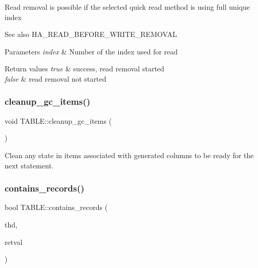 Read removal is possible if the selected quick read method is using full unique index

\begin{DoxySeeAlso}{See also}
H\+A\+\_\+\+R\+E\+A\+D\+\_\+\+B\+E\+F\+O\+R\+E\+\_\+\+W\+R\+I\+T\+E\+\_\+\+R\+E\+M\+O\+V\+AL
\end{DoxySeeAlso}

\begin{DoxyParams}{Parameters}
{\em index} & Number of the index used for read\\
\hline
\end{DoxyParams}

\begin{DoxyRetVals}{Return values}
{\em true} & success, read removal started \\
\hline
{\em false} & read removal not started \\
\hline
\end{DoxyRetVals}
\mbox{\label{structTABLE_a909ba0f0bb359144360ba9ef643cb3de}} 
\subsubsection{\texorpdfstring{cleanup\+\_\+gc\+\_\+items()}{cleanup\_gc\_items()}}
{\footnotesize\ttfamily void T\+A\+B\+L\+E\+::cleanup\+\_\+gc\+\_\+items (\begin{DoxyParamCaption}{ }\end{DoxyParamCaption})}

Clean any state in items associated with generated columns to be ready for the next statement. \mbox{\label{structTABLE_a4700cba1178e407b48dc49b217a3aac6}} 
\subsubsection{\texorpdfstring{contains\+\_\+records()}{contains\_records()}}
{\footnotesize\ttfamily bool T\+A\+B\+L\+E\+::contains\+\_\+records (\begin{DoxyParamCaption}\item[{T\+HD $\ast$}]{thd,  }\item[{bool $\ast$}]{retval }\end{DoxyParamCaption})}

